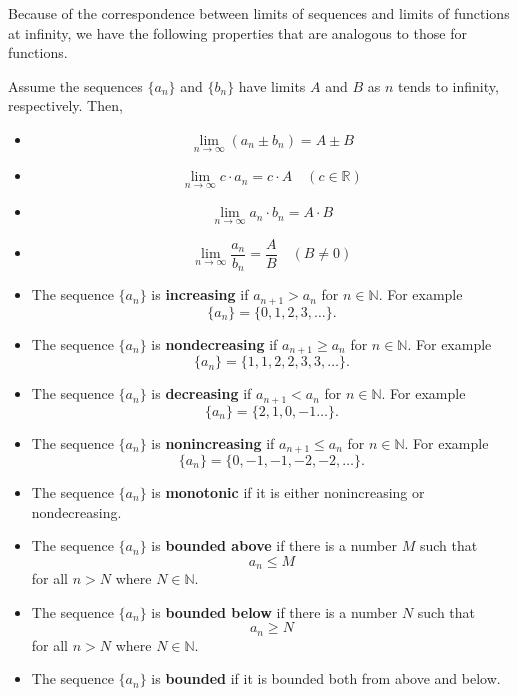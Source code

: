 \documentclass[compacto,10pt,comentarios]{aleph-notas}
\begin{document}
Because of the correspondence between limits of sequences and limits of functions at infinity, we have the following properties that are analogous to those for functions.
\begin{teo}
    Assume the sequences $\{a_n\}$ and $\{b_n\}$ have limits $A$ and $B$ as $n$ tends to infinity, respectively. Then,
    \begin{itemize}
        \item
        $$
            \lim_{n \to \infty} \left(a_n \pm b_n \right) = A \pm B
        $$
        \item
        $$
            \lim_{n \to \infty} c \cdot a_n = c \cdot A \quad (c \in \mathbb{R})
        $$
        \item
        $$
            \lim_{n \to \infty} a_n \cdot b_n = A \cdot B
        $$
        \item
        $$
            \lim_{n \to \infty} \frac{a_n}{b_n} = \frac{A}{B} \quad (B \neq 0)
        $$
    \end{itemize}
\end{teo}

\begin{defi}
    \begin{itemize}
        \item The sequence $\{a_n\}$ is \textbf{increasing} if $a_{n+1} > a_n$ for $n \in \mathbb{N}$. For example
        $$
            \{a_n\} = \{0, 1, 2, 3, \ldots \}.
        $$
        \item The sequence $\{a_n\}$ is \textbf{nondecreasing} if $a_{n+1} \geq a_n$ for $n \in \mathbb{N}$. For example
        $$
            \{a_n\} = \{1, 1, 2, 2, 3, 3, \ldots \}.
        $$
        \item The sequence  $\{a_n\}$ is \textbf{decreasing} if $a_{n+1} < a_n$ for $n \in \mathbb{N}$. For example
        $$
            \{a_n\} = \{2, 1, 0, -1 \ldots \}.
        $$
        \item  The sequence $\{a_n\}$ is \textbf{nonincreasing} if $a_{n+1} \leq a_n$ for $n \in \mathbb{N}$. For example
        $$
            \{a_n\} = \{0, -1, -1, -2, -2,\ldots \}.
        $$
        \item The sequence $\{a_n\}$ is \textbf{monotonic} if it is either nonincreasing or nondecreasing.
        \item The sequence $\{a_n\}$ is \textbf{bounded above} if there is a number $M$ such that
        $$
            a_n \leq M
        $$
        for all $n > N$ where $N \in \mathbb{N}$.
        \item The sequence $\{a_n\}$ is \textbf{bounded below} if there is a number $N$ such that
        $$
            a_n \geq N
        $$
        for all $n > N$ where $N \in \mathbb{N}$.
        \item The sequence $\{a_n\}$ is \textbf{bounded} if it is bounded both from above and below.
    \end{itemize}
\end{defi}
\end{document}
